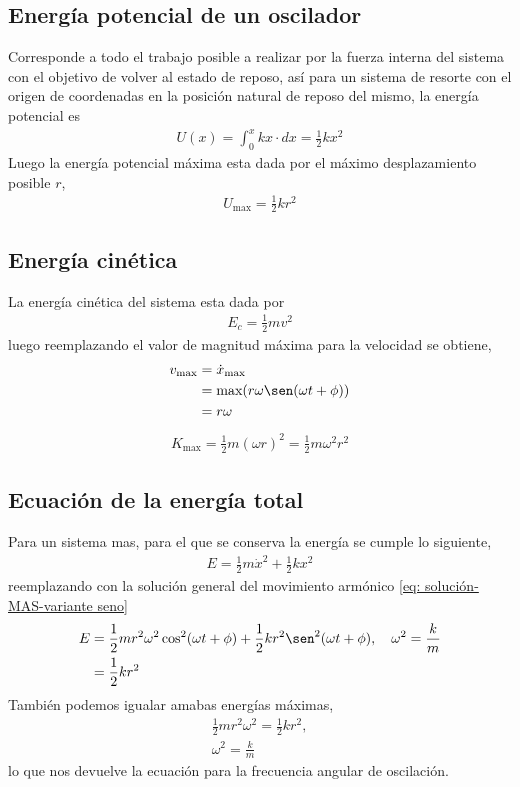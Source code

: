 \documentclass[12pt]{article}
\begin{document}
\subsection{Energía potencial de un oscilador}
Corresponde a todo el trabajo posible a realizar por la fuerza interna del sistema con el objetivo de volver al estado de reposo,  así para un sistema de resorte con el origen de coordenadas en la posición natural de reposo del mismo, la energía potencial es
\begin{align*}
    U(x) = \int_{0}^{x} kx \cdot dx = \frac{1}{2 }kx^{2}
\end{align*}
Luego la energía potencial máxima esta dada por el máximo desplazamiento posible \(r\), 
\begin{align}
    U_{ \text{max}} = \frac{1}{2}kr^{2} \nonumber
\end{align}
\subsection{Energía cinética}
La energía cinética del sistema esta dada por
\begin{align*}
    E_c = \frac{1}{2}mv^{2}
\end{align*}
luego reemplazando el valor de magnitud máxima para la velocidad se obtiene, 
\begin{align*}
    v_\text{max} &= \dot{x}_\text{max} \\
    &= \text{max}(r\omega\sen(\omega t + \phi)) \\
    &= r\omega 
\end{align*}
\begin{align*}
    K_{\text{max}} = \frac{1}{2}m(\omega r )^{2} = \frac{1}{2}m \omega^{2} r^{2}
\end{align*}
\subsection{Ecuación de la energía total}
Para un sistema mas, para el que se conserva la energía se  cumple lo siguiente,
\begin{align}
    E = \frac{1}{2} m \dot{x}^{2} + \frac{1}{2}kx^{2}
\end{align}
reemplazando con la solución general del movimiento armónico \eqref{eq: solución-MAS-variante seno}
\begin{align*}
    E &= \frac{1}{2} m r^{2}\omega^{2} \cos^{2}(\omega t + \phi) + \frac{1}{2} k r^{2}\sen^{2}(\omega t + \phi), \quad \omega^{2} = \frac{k}{m} \\
    &= \frac{1}{2}k r^{2}
\end{align*}
También podemos igualar amabas energías máximas,
\begin{align*}
    \frac{1}{2}mr^{2}\omega^{2} = \frac{1}{2}kr^{2},\\
    \omega^{2} = \frac{k}{m}
\end{align*}
lo que nos devuelve la ecuación para la frecuencia angular de oscilación.
\end{document}

